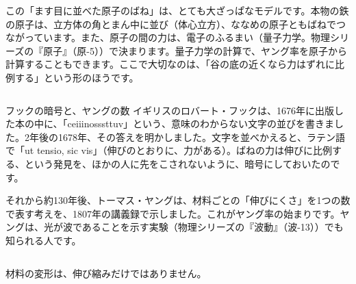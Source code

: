 \begin{seikaku}
この「ます目に並べた原子のばね」は、とても大ざっぱなモデルです。本物の鉄の原子は、立方体の角とまん中に並び（体心立方）、ななめの原子ともばねでつながっています。また、原子の間の力は、電子のふるまい（量子力学。物理シリーズの『原子』（原-5））で決まります。量子力学の計算で、ヤング率を原子から計算することもできます。ここで大切なのは、「谷の底の近くなら力はずれに比例する」という形のほうです。
\end{seikaku}

\begin{column}{フックの暗号と、ヤングの数}
イギリスのロバート・フックは、1676年に出版した本の中に、「ceiiinosssttuv」という、意味のわからない文字の並びを書きました。2年後の1678年、その答えを明かしました。文字を並べかえると、ラテン語で「ut tensio, sic vis」（伸びのとおりに、力がある）。ばねの力は伸びに比例する、という発見を、ほかの人に先をこされないように、暗号にしておいたのです。

それから約130年後、トーマス・ヤングは、材料ごとの「伸びにくさ」を1つの数で表す考えを、1807年の講義録で示しました。これがヤング率の始まりです。ヤングは、光が波であることを示す実験（物理シリーズの『波動』（波-13））でも知られる人です。
\end{column}

\leavevmode\label{ph:力-8:sec4}材料の変形は、伸び縮みだけではありません。


